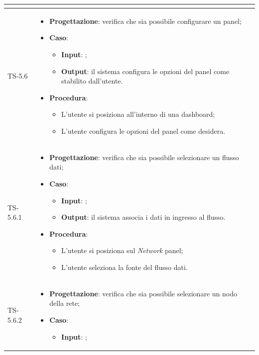 \begin{longtable}{|C{2.5cm}|C{13cm}|}
\begin{itemize}
\begin{itemize}
	\end{itemize} 
\end{itemize}
	 \\
	\hline
	{TS-5.6} & 
\begin{itemize}
	\item \textbf{Progettazione}: verifica che sia possibile configurare un
	panel;
	\item \textbf{Caso}: 
	\begin{itemize}
		\item \textbf{Input}: ;
		\item \textbf{Output}: il sistema configura le opzioni del panel come stabilito dall'utente.
	\end{itemize}
	\item \textbf{Procedura}:
	\begin{itemize}
		\item L'utente si posiziona all'interno di una dashboard;
		\item L'utente configura le opzioni del panel come desidera.
	\end{itemize} 
\end{itemize}
	\\
	\hline
	{TS-5.6.1} & 
\begin{itemize}
	\item \textbf{Progettazione}: verifica che sia possibile selezionare un
	flusso dati;
	\item \textbf{Caso}: 
	\begin{itemize}
		\item \textbf{Input}: ;
		\item \textbf{Output}: il sistema associa i dati in ingresso al flusso.
	\end{itemize}
	\item \textbf{Procedura}:
	\begin{itemize}
		\item L'utente si posiziona sul \emph{Network} panel;
		\item L'utente seleziona la fonte del flusso dati.
	\end{itemize} 
\end{itemize}
	 \\
	\hline
	{TS-5.6.2} & 
\begin{itemize}
	\item \textbf{Progettazione}: verifica che sia possibile selezionare un
	nodo della rete;
	\item \textbf{Caso}: 
	\begin{itemize}
		\item \textbf{Input}: ;

\end{itemize}
\end{itemize}
\end{longtable}
